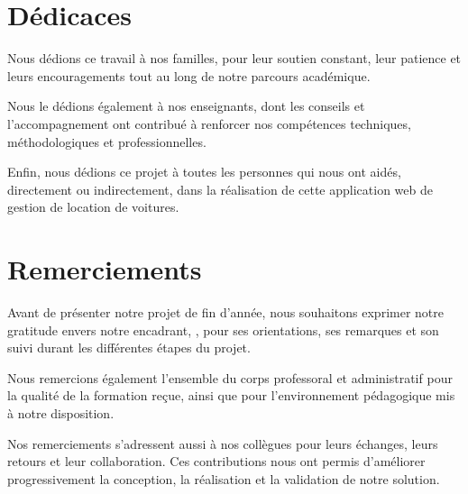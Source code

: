 \chapter*{Dédicaces}
Nous dédions ce travail à nos familles, pour leur soutien constant, leur patience et leurs encouragements tout au long de notre parcours académique.

Nous le dédions également à nos enseignants, dont les conseils et l'accompagnement ont contribué à renforcer nos compétences techniques, méthodologiques et professionnelles.

Enfin, nous dédions ce projet à toutes les personnes qui nous ont aidés, directement ou indirectement, dans la réalisation de cette application web de gestion de location de voitures.

\clearpage
\chapter*{Remerciements}
Avant de présenter notre projet de fin d'année, nous souhaitons exprimer notre gratitude envers notre encadrant, \encadrantEcole, pour ses orientations, ses remarques et son suivi durant les différentes étapes du projet.

Nous remercions également l'ensemble du corps professoral et administratif pour la qualité de la formation reçue, ainsi que pour l'environnement pédagogique mis à notre disposition.

Nos remerciements s'adressent aussi à nos collègues pour leurs échanges, leurs retours et leur collaboration. Ces contributions nous ont permis d'améliorer progressivement la conception, la réalisation et la validation de notre solution.
\clearpage
